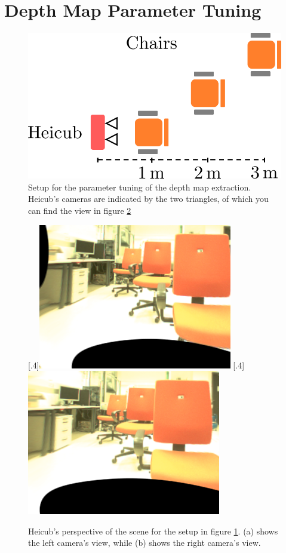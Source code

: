 \section{Depth Map Parameter Tuning}
\label{sec::52_dm}

\begin{figure}[h]
	\centering
	\includegraphics[scale=.4]{chapters/05_experiments/img/wls_setup.png}
	\caption{Setup for the parameter tuning of the depth map extraction. Heicub's cameras are indicated by the two triangles, of which you can find the view in figure \ref{fig::52_wls_rgb}}
	\label{fig::52_wls_setup}
\end{figure}
\begin{figure}[h]
	\centering
	\subcaptionbox{}%
	[.4\linewidth]{\includegraphics[scale=.3]{chapters/05_experiments/img/l_rgb.png}}
	\subcaptionbox{}%
	[.4\linewidth]{\includegraphics[scale=.3]{chapters/05_experiments/img/r_rgb.png}}
	\caption{Heicub's perspective of the scene for the setup in figure \ref{fig::52_wls_setup}. (a) shows the left camera's view, while (b) shows the right camera's view.}
	\label{fig::52_wls_rgb}
\end{figure}

